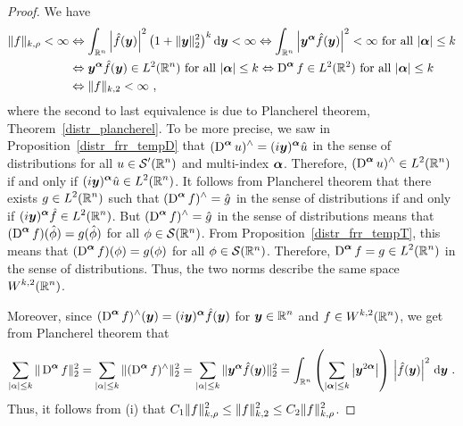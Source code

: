 \begin{proof}
  We have
\begin{align*}
\|f\|_{k,\rho} < \infty
&\Leftrightarrow \int_{\mathbb{R}^n} \left| \hat{f}({\bm{y}})\right|^2
\big( 1 + \|{\bm{y}}\|_2^2\big)^k \,\mathrm{d}{{\bm{y}}} < \infty
\Leftrightarrow \int_{\mathbb{R}^n} \left| {\bm{y}}^{{\bm{\alpha}}}
\hat{f}({\bm{y}}) \right|^2 < \infty \ \text{for all} \ |{\bm{\alpha}}| \leq k \\
&\Leftrightarrow {\bm{y}}^{{\bm{\alpha}}} \hat{f}({\bm{y}}) \in L^2(\mathbb{R}^n)
 \ \text{for all} \ |{\bm{\alpha}}| \leq k  
\Leftrightarrow \operatorname{D}^{{\bm{\alpha}}} f \in L^2(\mathbb{R}^2) 
  \ \text{for all} \ |{\bm{\alpha}}| \leq k \\
&\Leftrightarrow \|f\|_{k,2} < \infty \ ,
\end{align*}
where the second to last equivalence is due to 
Plancherel theorem, Theorem~\ref{distr_plancherel}.  To be
more precise, we saw in Proposition~\ref{distr_frr_tempD} that 
$\displaystyle (\operatorname{D}^{{\bm{\alpha}}} u)^\wedge
= (i {\bm{y}})^{{\bm{\alpha}}} \hat{u}$ in the
sense of distributions for all $\displaystyle u \in \mathcal{S}'(\mathbb{R}^n)$ and
multi-index ${\bm{\alpha}}$.
Therefore, $\displaystyle (\operatorname{D}^{{\bm{\alpha}}} u)^\wedge \in L^2(\mathbb{R}^n)$
if and only if
$\displaystyle (i {\bm{y}})^{{\bm{\alpha}}} \hat{u} \in L^2(\mathbb{R}^n)$.  It follows
from Plancherel theorem that there exists $\displaystyle g \in L^2(\mathbb{R}^n)$
such that $\displaystyle (\operatorname{D}^{{\bm{\alpha}}} f)^\wedge = \hat{g}$ in
the sense of distributions if and only if
$\displaystyle (i {\bm{y}})^{{\bm{\alpha}}} \hat{f} \in L^2(\mathbb{R}^n)$.
But $\displaystyle (\operatorname{D}^{{\bm{\alpha}}} f)^\wedge = \hat{g}$ in the sense of
distributions means that
$\displaystyle (\operatorname{D}^{{\bm{\alpha}}} f)(\hat{\phi}) = g(\hat{\phi})$
for all $\phi \in \mathcal{S}(\mathbb{R}^n)$.  From
Proposition~\ref{distr_frr_tempT}, this means that
$\displaystyle (\operatorname{D}^{{\bm{\alpha}}} f)(\phi) = g(\phi)$
for all $\phi \in \mathcal{S}(\mathbb{R}^n)$.  Therefore,
$\displaystyle \operatorname{D}^{{\bm{\alpha}}} f = g \in L^2(\mathbb{R}^n)$ in the sense of
distributions.
Thus, the two norms describe the same space $\displaystyle W^{k,2}(\mathbb{R}^n)$.

Moreover, since
$\displaystyle (\operatorname{D}^{{\bm{\alpha}}} f)^\wedge({\bm{y}})
=(i{\bm{y}})^{{\bm{\alpha}}} \hat{f}({\bm{y}})$
for $\displaystyle {\bm{y}}\in \mathbb{R}^n$ and
$\displaystyle f \in W^{k,2}(\mathbb{R}^n)$, we get from Plancherel theorem that
\[
\sum_{|\alpha|\leq k} \| \operatorname{D}^{{\bm{\alpha}}} f \|_2^2 =
\sum_{|\alpha|\leq k} \| (\operatorname{D}^{{\bm{\alpha}}} f)^\wedge \|_2^2 =
\sum_{|\alpha|\leq k} \| {\bm{y}}^{{\bm{\alpha}}} \hat{f}({\bm{y}}) \|_2^2 =
\int_{\mathbb{R}^n} \left( \sum_{|{\bm{\alpha}}|\leq k}
\left|{\bm{y}}^{2{{\bm{\alpha}}}}\right| \right)
\, \left| \hat{f}({\bm{y}}) \right|^2 \,\mathrm{d}{{\bm{y}}} \ .
\]
Thus, it follows from (i) that $\displaystyle C_1 \|f\|_{k,\rho}^2
\leq \|f\|_{k,2}^2 \leq C_2 \|f\|_{k,\rho}^2$.
\end{proof}

